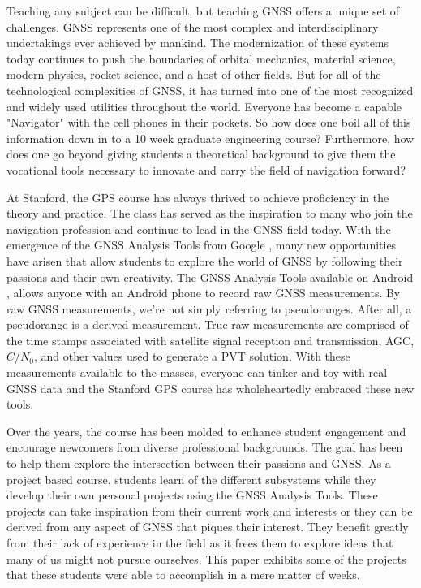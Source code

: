 \documentclass[12pt, conference, onecolumn, draftclsnofoot]{IEEEtran}
\begin{document}
Teaching any subject can be difficult, but teaching GNSS offers a unique set of challenges.
GNSS represents one of the most complex and interdisciplinary undertakings ever achieved by mankind.
The modernization of these systems today continues to push the boundaries of orbital mechanics, material science, modern physics, rocket science, and a host of other fields.
But for all of the technological complexities of GNSS, it has turned into one of the most recognized and widely used utilities throughout the world.
Everyone has become a capable "Navigator" with the cell phones in their pockets.
So how does one boil all of this information down in to a 10 week graduate engineering course?
Furthermore, how does one go beyond giving students a theoretical background to give them the vocational tools necessary to innovate and carry the field of navigation forward?

At Stanford, the GPS course has always thrived to achieve proficiency in the theory and practice.
The class has served as the inspiration to many who join the navigation profession and continue to lead in the GNSS field today.
With the emergence of the GNSS Analysis Tools from Google \cite{vanDiggelen2018}, many new opportunities have arisen that allow students to explore the world of GNSS by following their passions and their own creativity.
The GNSS Analysis Tools available on Android \cite{GNSSAnalysisTools}, allows anyone with an Android phone to record raw GNSS measurements.
By raw GNSS measurements, we're not simply referring to pseudoranges.
After all, a pseudorange is a derived measurement.
True raw measurements are comprised of the time stamps associated with satellite signal reception and transmission, AGC, $C$/$N_0$, and other values used to generate a PVT solution.
With these measurements available to the masses, everyone can tinker and toy with real GNSS data and the Stanford GPS course has wholeheartedly embraced these new tools.

Over the years, the course has been molded to enhance student engagement and encourage newcomers from diverse professional backgrounds. 
The goal has been to help them explore the intersection between their passions and GNSS.
As a project based course, students learn of the different subsystems while they develop their own personal projects using the GNSS Analysis Tools.
These projects can take inspiration from their current work and interests or they can be derived from any aspect of GNSS that piques their interest.
They benefit greatly from their lack of experience in the field as it frees them to explore ideas that many of us might not pursue ourselves.
This paper exhibits some of the projects that these students were able to accomplish in a mere matter of weeks.
\end{document}
